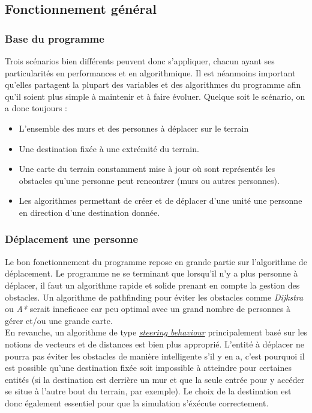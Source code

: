 \documentclass[11pt]{article} %
\begin{document}
\subsection{Fonctionnement général}
\subsubsection{Base du programme}
Trois scénarios bien différents peuvent donc s'appliquer, chacun ayant ses particularités en performances et en algorithmique.
Il est néanmoins important qu'elles partagent la plupart des variables et des algorithmes du programme afin qu'il soient plus simple à maintenir et à faire évoluer. Quelque soit le scénario, on a donc toujours : 
\begin{itemize}
	
	\item L'ensemble des murs et des personnes à déplacer sur le terrain 
	\item Une destination fixée à une extrémité du terrain.
	\item Une carte du terrain constamment mise à jour où sont représentés les obstacles qu'une personne peut rencontrer (murs ou 			autres personnes).
	\item Les algorithmes permettant de créer et de déplacer d'une unité une personne en direction d'une destination donnée.
\end{itemize}

\subsubsection{Déplacement une personne}
Le bon fonctionnement du programme repose en grande partie sur l'algorithme de déplacement. Le programme ne se terminant que lorsqu'il n'y a plus personne à déplacer, il faut un algorithme rapide et solide prenant en compte la gestion des obstacles. Un algorithme de pathfinding pour éviter les obstacles comme \textit{Dijkstra} ou \textit{A*} serait inneficace car peu optimal avec un grand nombre de personnes à gérer et/ou une grande carte. \\
En revanche, un algorithme de type \href{https://gamedevelopment.tutsplus.com/tutorials/understanding-steering-behaviors-seek--gamedev-849}{\textit{steering behaviour}} principalement basé sur les notions de vecteurs et de distances est bien plus approprié.
L'entité à déplacer ne pourra pas éviter les obstacles de manière intelligente s'il y en a, c'est pourquoi il est possible qu'une destination fixée soit impossible à atteindre pour certaines entités (si la destination est derrière un mur et que la seule entrée pour y accéder se situe à l'autre bout du terrain, par exemple). Le choix de la destination est donc également essentiel pour que la simulation s'éxécute correctement.
\end{document}

